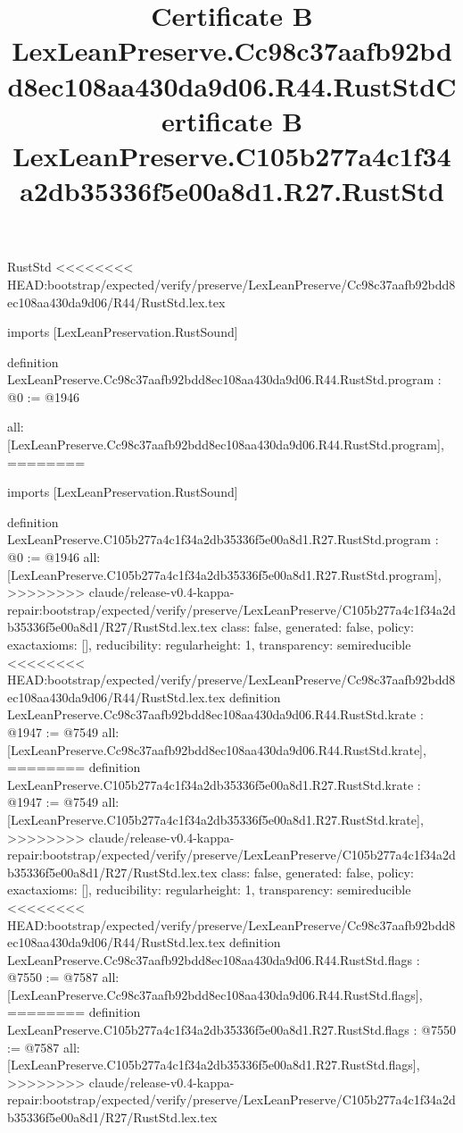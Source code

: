 \begin{lexlean}{RustStd}
<<<<<<<< HEAD:bootstrap/expected/verify/preserve/LexLeanPreserve/Cc98c37aafb92bdd8ec108aa430da9d06/R44/RustStd.lex.tex
\title{Certificate B LexLeanPreserve.Cc98c37aafb92bdd8ec108aa430da9d06.R44.RustStd}
\begin{coremodule}
imports [LexLeanPreservation.RustSound]

definition LexLeanPreserve.Cc98c37aafb92bdd8ec108aa430da9d06.R44.RustStd.program : @0 := @1946 {
  all: [LexLeanPreserve.Cc98c37aafb92bdd8ec108aa430da9d06.R44.RustStd.program],
========
\title{Certificate B LexLeanPreserve.C105b277a4c1f34a2db35336f5e00a8d1.R27.RustStd}
\begin{coremodule}
imports [LexLeanPreservation.RustSound]

definition LexLeanPreserve.C105b277a4c1f34a2db35336f5e00a8d1.R27.RustStd.program : @0 := @1946 {
  all: [LexLeanPreserve.C105b277a4c1f34a2db35336f5e00a8d1.R27.RustStd.program],
>>>>>>>> claude/release-v0.4-kappa-repair:bootstrap/expected/verify/preserve/LexLeanPreserve/C105b277a4c1f34a2db35336f5e00a8d1/R27/RustStd.lex.tex
  class: false,
  generated: false,
  policy: exact{axioms: []},
  reducibility: regular{height: 1},
  transparency: semireducible
}
<<<<<<<< HEAD:bootstrap/expected/verify/preserve/LexLeanPreserve/Cc98c37aafb92bdd8ec108aa430da9d06/R44/RustStd.lex.tex
definition LexLeanPreserve.Cc98c37aafb92bdd8ec108aa430da9d06.R44.RustStd.krate : @1947 := @7549 {
  all: [LexLeanPreserve.Cc98c37aafb92bdd8ec108aa430da9d06.R44.RustStd.krate],
========
definition LexLeanPreserve.C105b277a4c1f34a2db35336f5e00a8d1.R27.RustStd.krate : @1947 := @7549 {
  all: [LexLeanPreserve.C105b277a4c1f34a2db35336f5e00a8d1.R27.RustStd.krate],
>>>>>>>> claude/release-v0.4-kappa-repair:bootstrap/expected/verify/preserve/LexLeanPreserve/C105b277a4c1f34a2db35336f5e00a8d1/R27/RustStd.lex.tex
  class: false,
  generated: false,
  policy: exact{axioms: []},
  reducibility: regular{height: 1},
  transparency: semireducible
}
<<<<<<<< HEAD:bootstrap/expected/verify/preserve/LexLeanPreserve/Cc98c37aafb92bdd8ec108aa430da9d06/R44/RustStd.lex.tex
definition LexLeanPreserve.Cc98c37aafb92bdd8ec108aa430da9d06.R44.RustStd.flags : @7550 := @7587 {
  all: [LexLeanPreserve.Cc98c37aafb92bdd8ec108aa430da9d06.R44.RustStd.flags],
========
definition LexLeanPreserve.C105b277a4c1f34a2db35336f5e00a8d1.R27.RustStd.flags : @7550 := @7587 {
  all: [LexLeanPreserve.C105b277a4c1f34a2db35336f5e00a8d1.R27.RustStd.flags],
>>>>>>>> claude/release-v0.4-kappa-repair:bootstrap/expected/verify/preserve/LexLeanPreserve/C105b277a4c1f34a2db35336f5e00a8d1/R27/RustStd.lex.tex
}}}
\end{coremodule}}
\end{coremodule}
\end{lexlean}
